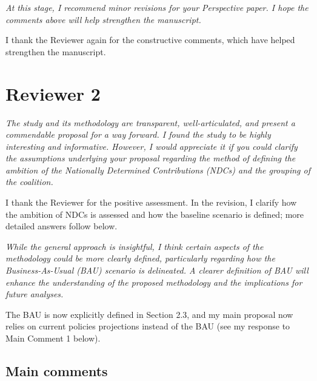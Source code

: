 \documentclass[11pt]{article}
\newenvironment{italic}{\itshape}{\par}
\begin{document}
\begin{italic}
At this stage, I recommend minor revisions for your Perspective paper. I hope the comments above will help strengthen the manuscript.
\end{italic}



I thank the Reviewer again for the constructive comments, which have helped strengthen the manuscript.


\section*{Reviewer 2}

\begin{italic}
The study and its methodology are transparent, well-articulated, and present a commendable proposal for a way forward. I found the study to be highly interesting and informative. However, I would appreciate it if you could clarify the assumptions underlying your proposal regarding the method of defining the ambition of the Nationally Determined Contributions (NDCs) and the grouping of the coalition.
\end{italic}



I thank the Reviewer for the positive assessment. In the revision, I clarify how the ambition of NDCs is assessed and how the baseline scenario is defined; more detailed answers follow below.


\begin{italic}
While the general approach is insightful, I think certain aspects of the methodology could be more clearly defined, particularly regarding how the Business-As-Usual (BAU) scenario is delineated. A clearer definition of BAU will enhance the understanding of the proposed methodology and the implications for future analyses.
\end{italic}

The BAU is now explicitly defined in Section 2.3, and my main proposal now relies on current policies projections instead of the BAU (see my response to Main Comment 1 below).



\subsection*{Main comments}
\end{document}
